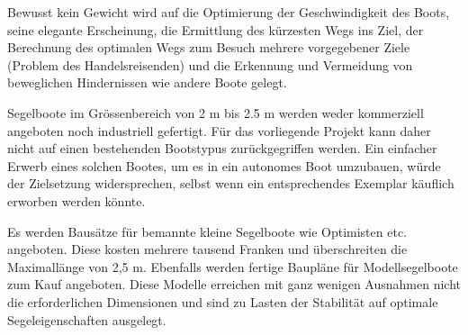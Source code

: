 Bewusst kein Gewicht wird auf die Optimierung der Geschwindigkeit des Boots, seine elegante Erscheinung, die Ermittlung des kürzesten Wegs ins Ziel, der Berechnung des optimalen Wegs zum Besuch mehrere vorgegebener Ziele (Problem des Handelsreisenden) und die Erkennung und Vermeidung von beweglichen Hindernissen wie andere Boote gelegt. 

Segelboote im Grössenbereich von 2 m bis 2.5 m werden weder kommerziell angeboten noch industriell gefertigt. Für das vorliegende Projekt kann daher nicht auf einen bestehenden Bootstypus zurückgegriffen werden. Ein einfacher Erwerb eines solchen Bootes, um es in ein autonomes Boot umzubauen, würde der Zielsetzung widersprechen, selbst wenn ein entsprechendes Exemplar käuflich erworben werden könnte.

Es werden Bausätze für bemannte kleine Segelboote wie Optimisten etc. angeboten. Diese kosten mehrere tausend Franken und überschreiten die Maximallänge von 2,5 m. Ebenfalls werden fertige Baupläne für Modellsegelboote zum Kauf angeboten. Diese Modelle erreichen mit ganz wenigen Ausnahmen nicht die erforderlichen Dimensionen und sind zu Lasten der Stabilität auf optimale Segeleigenschaften ausgelegt. 

